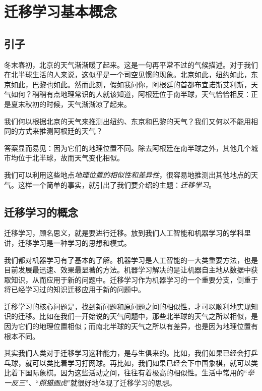 \newpage


\setcounter{page}{1}

\section{迁移学习基本概念} \label{overview}%

\subsection{引子}

冬末春初，北京的天气渐渐暖了起来。这是一句再平常不过的气候描述。对于我们在北半球生活的人来说，这似乎是一个司空见惯的现象。北京如此，纽约如此，东京如此，巴黎也如此。然而此刻，假如我问你，阿根廷的首都布宜诺斯艾利斯，天气如何？稍稍有点地理常识的人就该知道，阿根廷位于南半球，天气恰恰相反：正是夏末秋初的时候，天气渐渐凉了起来。

我们何以根据北京的天气来推测出纽约、东京和巴黎的天气？我们又何以不能用相同的方式来推测阿根廷的天气？

答案显而易见：因为它们的地理位置不同。除去阿根廷在南半球之外，其他几个城市均位于北半球，故而天气变化相似。

我们可以利用这些地点\textit{地理位置的相似性和差异性}，很容易地推测出其他地点的天气。这样一个简单的事实，就引出了我们要介绍的主题：\textit{迁移学习}。

\subsection{迁移学习的概念}

迁移学习，顾名思义，就是要进行迁移。放到我们人工智能和机器学习的学科里讲，迁移学习是一种学习的思想和模式。

我们都对机器学习有了基本的了解。机器学习是人工智能的一大类重要方法，也是目前发展最迅速、效果最显著的方法。机器学习解决的是让机器自主地从数据中获取知识，从而应用于新的问题中。迁移学习作为机器学习的一个重要分支，侧重于将已经学习过的知识迁移应用于新的问题中。

迁移学习的核心问题是，找到新问题和原问题之间的相似性，才可以顺利地实现知识的迁移。比如在我们一开始说的天气问题中，那些北半球的天气之所以相似，是因为它们的地理位置相似；而南北半球的天气之所以有差异，也是因为地理位置有根本不同。

其实我们人类对于迁移学习这种能力，是与生俱来的。比如，我们如果已经会打乒乓球，就可以类比着学习打网球。再比如，我们如果已经会下中国象棋，就可以类比着下国际象棋。因为这些活动之间，往往有着极高的相似性。生活中常用的“\textit{举一反三}”、“\textit{照猫画虎}”就很好地体现了迁移学习的思想。

